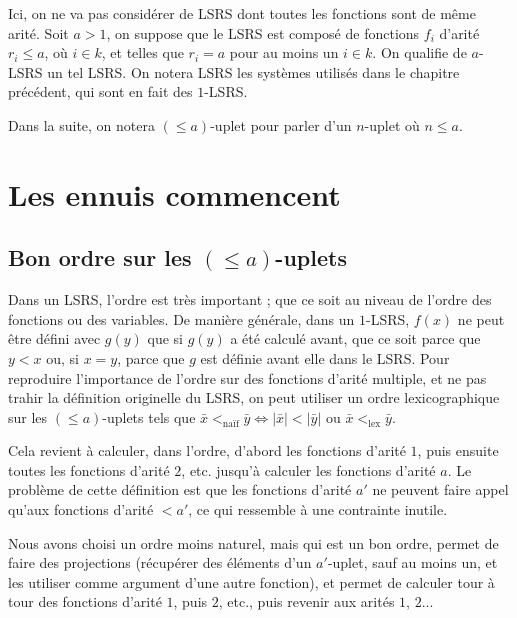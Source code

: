 \documentclass{report}
\newcommand{\leqa}{\left( \leqslant a \right)}
\begin{document}
	Ici, on ne va pas considérer de LSRS dont toutes les fonctions sont de même arité. Soit $a>1$, on suppose que le LSRS est composé de fonctions $f_i$ d'arité $r_i \leqslant a$, où $i \in k$, et telles que $r_i = a$ pour au moins un $i\in k$. On qualifie de $a$-LSRS un tel LSRS. On notera LSRS les systèmes utilisés dans le chapitre précédent, qui sont en fait des $1$-LSRS. 
	
	Dans la suite, on notera $\leqa$-uplet pour parler d'un $n$-uplet où $n\leqslant a$. 
	
	
	\section{Les ennuis commencent}
	\label{sec:ennuis_commencent}
	
		\subsection{Bon ordre sur les $\leqa$-uplets}
		\label{subsec:bon_ordre_uplets}
		
		Dans un LSRS, l'ordre est très important ; que ce soit au niveau de l'ordre des fonctions ou des variables. De manière générale, dans un $1$-LSRS, $f(x)$ ne peut être défini avec $g(y)$ que si $g(y)$ a été calculé avant, que ce soit parce que $y<x$ ou, si $x=y$, parce que $g$ est définie avant elle dans le LSRS. 
		Pour reproduire l'importance de l'ordre sur des fonctions d'arité multiple, et ne pas trahir la définition originelle du LSRS, on peut utiliser un ordre lexicographique sur les $\leqa$-uplets tels que $\bar{x} <_{\text{naïf}} \bar{y} \Leftrightarrow \left|\bar{x}\right| < \left|\bar{y}\right| \text{ ou } \bar{x} <_{\text{lex}} \bar{y}$. 
			
		Cela revient à calculer, dans l'ordre, d'abord les fonctions d'arité $1$, puis ensuite toutes les fonctions d'arité $2$, etc. jusqu'à calculer les fonctions d'arité $a$. Le problème de cette définition est que les fonctions d'arité $a'$ ne peuvent faire appel qu'aux fonctions d'arité $<a'$, ce qui ressemble à une contrainte inutile\footnotemark.
		
		
		Nous avons choisi un ordre moins naturel, mais qui est un bon ordre, permet de faire des projections (récupérer des éléments d'un $a'$-uplet, sauf au moins un, et les utiliser comme argument d'une autre fonction), et permet de calculer tour à tour des fonctions d'arité $1$, puis $2$, etc., puis revenir aux arités $1$, $2$...
		
\end{document}
